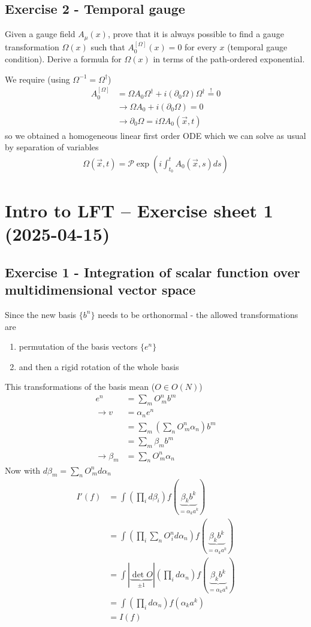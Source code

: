 \documentclass[10pt,a4paper]{article}
\theoremstyle{definition}
\begin{document}
\subsection{Exercise 2 - Temporal gauge}
{\color{blue}
Given a gauge field $A_\mu(x)$, prove that it is always possible to find a gauge transformation $\Omega(x)$ such that $A^{[\Omega]}_0(x)=0$ for every $x$ (temporal gauge condition). Derive a formula for $\Omega(x)$ in terms of the path-ordered exponential.
}

We require (using $\Omega^{-1}=\Omega^\dagger$)
\begin{align}
A_0^{[\Omega]} 
&= \Omega A_0 \Omega^\dagger + i (\partial_0 \Omega) \Omega^\dagger\overset{!}{=}0\\
&\rightarrow  \Omega A_0 + i(\partial_0 \Omega)=0\\
&\rightarrow  \partial_0 \Omega=i\Omega A_0(\vec{x},t)
\end{align}
so we obtained a homogeneous linear first order ODE which we can solve as usual by separation of variables
\begin{align}
\Omega(\vec{x},t)=\mathcal{P}\exp\left(i\int_{t_0}^t A_0(\vec{x},s) ds\right)
\end{align}

\newpage
\section{Intro to LFT – Exercise sheet 1 (2025-04-15)}
\subsection{Exercise 1 - Integration of scalar function over multidimensional vector space}
Since the new basis $\{b^n\}$ needs to be orthonormal - the allowed transformations are
\begin{enumerate}
\item permutation of the basis vectors $\{e^n\}$
\item and then a rigid rotation of the whole basis  
\end{enumerate}
This transformations of the basis mean ($O\in O(N)$)
\begin{align}
e^n&=\sum_mO^n_{\,m}b^m\\
\rightarrow v&=\alpha_n e^n\\
&=\sum_m(\sum_n O^n_{\,m}\alpha_n) b^m\\
&=\sum_m\beta_m b^m\\
\rightarrow \beta_m&=\sum_n O^n_{\,m}\alpha_n
\end{align}
Now with $d\beta_m=\sum_n O^n_{\,m}d\alpha_n$
\begin{align}
I'(f)
&=\int\left(\prod_i d\beta_i\right)  f(\underbrace{\beta_k b^k}_{=\alpha_k a^k})\\
&=\int\left(\prod_i \sum_n O^n_{\,i}d\alpha_n\right)  f(\underbrace{\beta_k b^k}_{=\alpha_k a^k})\\
&=\int |\underbrace{\det O}_{\pm1}|\left(\prod_i d\alpha_n\right)  f(\underbrace{\beta_k b^k}_{=\alpha_k a^k})\\
&=\int \left(\prod_i d\alpha_n\right)  f(\alpha_k a^k)\\
&=I(f)
\end{align}
\end{document}
